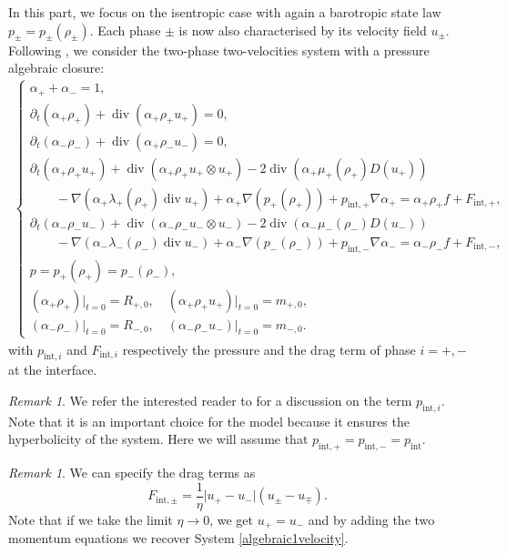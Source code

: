 \documentclass[11pt, twoside, a4paper]{article}
\theoremstyle{plain}
\theoremstyle{remark}
\newtheorem{remark}[theorem]{Remark}
\numberwithin{equation}{section}
\renewcommand{\div}{\operatorname{div}}
\newcommand{\dt}{\partial_t}
\newcommand{\ap}{\alpha_+}
\newcommand{\am}{\alpha_-}
\newcommand{\rp}{\rho_+}
\newcommand{\rmi}{\rho_-}
\begin{document}
In this part, we focus on the isentropic case with again a barotropic state law $p_\pm=p_\pm(\rho_\pm)$. Each phase $\pm$ is now also characterised by its velocity field $u_\pm$. Following \cite{bresch2024mathematical}, we consider the two-phase two-velocities system with a pressure algebraic closure:
\begin{align*}
    \left\{
        \begin{array}{l}
            \ap + \am = 1,\\
            \dt (\ap \rp) + \div(\ap \rp u_+) = 0,\\
            \dt (\am \rmi) + \div(\ap \rmi u_-) = 0,\\
            \dt (\ap \rp u_+) + \div (\ap \rp u_+ \otimes u_+) - 2 \div(\ap \mu_+(\rp) D(u_+))\\ 
            \quad \quad- \nabla ( \ap \lambda_+ (\rp) \div u_+ ) + \ap \nabla ( p_+(\rp)) + p_{\mathrm{int},+} \nabla \ap = \ap \rp f + F_{\mathrm{int},+},\\
            \dt (\am \rmi u_-) + \div (\am \rmi u_- \otimes u_-) - 2 \div(\am \mu_-(\rmi) D(u_-))\\
            \quad \quad - \nabla ( \am \lambda_- (\rmi) \div u_- ) + \am \nabla ( p_-(\rmi)) + p_{\mathrm{int},-} \nabla \am = \am \rmi f  + F_{\mathrm{int},-},\\
            p = p_+(\rp) = p_-(\rmi),\\
            (\ap \rp)\rvert_{t=0} = R_{+,0}, \quad (\ap \rp u_+)\rvert_{t=0} = m_{+,0},\\
            (\am \rmi)\rvert_{t=0} = R_{-,0}, \quad (\am \rmi u_-)\rvert_{t=0} = m_{-,0}.
        \end{array}
    \right.
\end{align*}
with $p_{\mathrm{int},i}$ and $F_{\mathrm{int},i}$ respectively the pressure and the drag term of phase $i=+,-$ at the interface. 

\begin{remark}
We refer the interested reader to \cite{bresch2018multi} for a discussion on the term $p_{\mathrm{int},i}$. Note that it is an important choice for the model because it ensures the hyperbolicity of the system. Here we will assume that $p_{\mathrm{int},+}=p_{\mathrm{int},-}=p_{\mathrm{int}}$.
\end{remark}


\begin{remark}
We can specify the drag terms as
$$F_{\mathrm{int},\pm} = \frac{1}{\eta} \lvert u_+ - u_- \rvert (u_\pm-u_\mp). $$
Note that if we take the limit $\eta \to 0$, we get $u_+=u_-$ and by adding the two momentum equations we recover System \eqref{algebraic1velocity}.
\end{remark}
\end{document}
